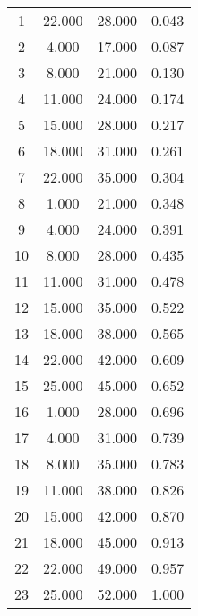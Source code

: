 % 
\begin{tabular}{cccc}
  \hline
  \hline
1 & 22.000 & 28.000 & 0.043 \\ 
  2 & 4.000 & 17.000 & 0.087 \\ 
  3 & 8.000 & 21.000 & 0.130 \\ 
  4 & 11.000 & 24.000 & 0.174 \\ 
  5 & 15.000 & 28.000 & 0.217 \\ 
  6 & 18.000 & 31.000 & 0.261 \\ 
  7 & 22.000 & 35.000 & 0.304 \\ 
  8 & 1.000 & 21.000 & 0.348 \\ 
  9 & 4.000 & 24.000 & 0.391 \\ 
  10 & 8.000 & 28.000 & 0.435 \\ 
  11 & 11.000 & 31.000 & 0.478 \\ 
  12 & 15.000 & 35.000 & 0.522 \\ 
  13 & 18.000 & 38.000 & 0.565 \\ 
  14 & 22.000 & 42.000 & 0.609 \\ 
  15 & 25.000 & 45.000 & 0.652 \\ 
  16 & 1.000 & 28.000 & 0.696 \\ 
  17 & 4.000 & 31.000 & 0.739 \\ 
  18 & 8.000 & 35.000 & 0.783 \\ 
  19 & 11.000 & 38.000 & 0.826 \\ 
  20 & 15.000 & 42.000 & 0.870 \\ 
  21 & 18.000 & 45.000 & 0.913 \\ 
  22 & 22.000 & 49.000 & 0.957 \\ 
  23 & 25.000 & 52.000 & 1.000 \\ 
   \hline
\end{tabular}
